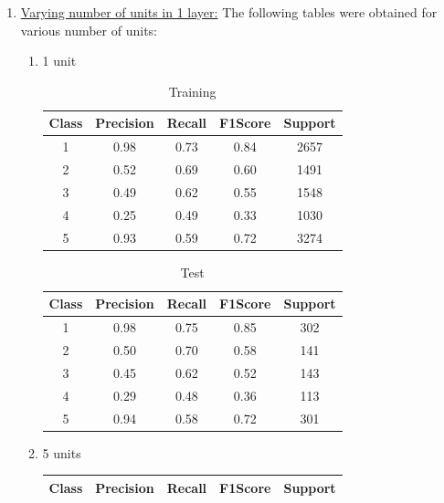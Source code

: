 \begin{enumerate}[label=(\alph*)]
    \item \underline{Varying number of units in 1 layer:} The following tables were obtained for various number of units:
    \begin{enumerate}[label=\roman*.]
        \item 1 unit
        \begin{table}[!htb]
            \centering
            \begin{tabular}{ccccc}
            \hline
            Class & Precision & Recall & F1Score & Support \\ \hline
            1     & 0.98      & 0.73   & 0.84    & 2657    \\
            2     & 0.52      & 0.69   & 0.60    & 1491    \\
            3     & 0.49      & 0.62   & 0.55    & 1548    \\
            4     & 0.25      & 0.49   & 0.33    & 1030    \\
            5     & 0.93      & 0.59   & 0.72    & 3274    \\ \hline
            \end{tabular}
            \caption{Training}
            \label{part b train 1 unit}
        \end{table}
        \begin{table}[!htb]
            \centering
            \begin{tabular}{ccccc}
            \hline
            Class & Precision & Recall & F1Score & Support \\ \hline
            1     & 0.98      & 0.75   & 0.85    & 302     \\
            2     & 0.50      & 0.70   & 0.58    & 141     \\
            3     & 0.45      & 0.62   & 0.52    & 143     \\
            4     & 0.29      & 0.48   & 0.36    & 113     \\
            5     & 0.94      & 0.58   & 0.72    & 301     \\ \hline
            \end{tabular}
            \caption{Test}
            \label{part b test 1 unit}
        \end{table}
        \item 5 units
        \begin{table}[!htb]
            \centering
            \begin{tabular}{ccccc}
            \hline
            Class & Precision & Recall & F1Score & Support \\ \hline

\end{tabular}
\end{table}
\end{enumerate}
\end{enumerate}
